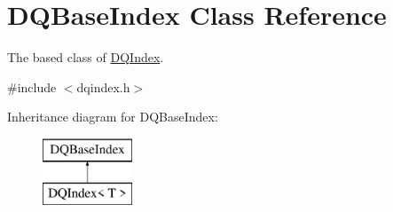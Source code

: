 \hypertarget{classDQBaseIndex}{
\section{DQBaseIndex Class Reference}
\label{classDQBaseIndex}
}


The based class of \hyperlink{classDQIndex}{DQIndex}.  




{\ttfamily \#include $<$dqindex.h$>$}

Inheritance diagram for DQBaseIndex:\begin{figure}[H]
\begin{center}
\leavevmode
\includegraphics[height=2.000000cm]{classDQBaseIndex}
\end{center}
\end{figure}
